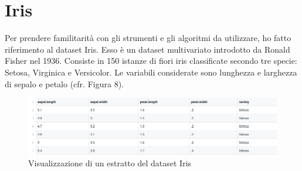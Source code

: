\documentclass[12pt,italian]{report}
\begin{document}
\section{Iris}
\label{iris}
Per prendere familitarità con gli strumenti e gli algoritmi da utilizzare, ho fatto riferimento al dataset Iris. Esso è un dataset multivariato introdotto da Ronald Fisher nel 1936. Consiste in 150 istanze di fiori iris classificate secondo tre specie: Setosa, Virginica e Versicolor.
Le variabili considerate sono lunghezza e larghezza di sepalo e petalo (cfr. Figura 8). 
\begin{figure}[h]
	\centering
	\includegraphics[width = \textwidth]{immagini/Iris}
	\caption{Visualizzazione di un estratto del dataset Iris}
\end{figure}
\end{document}
